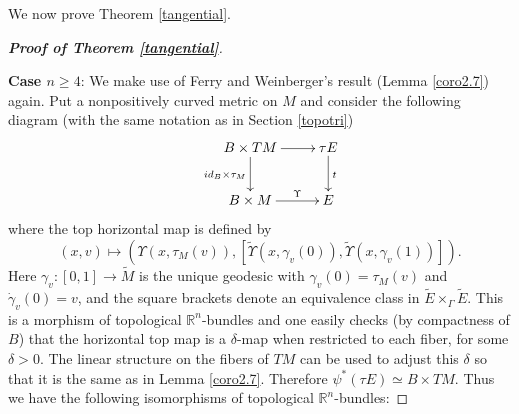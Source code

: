 \documentclass[onecolumn,notitlepage,11pt]{article}
\newcommand{\R}{\mathbb{R}}
\newcommand{\beq}{\begin{equation*}}
\newcommand{\eeq}{\end{equation*}}
\newtheorem{lemma}{Lemma}[section]
\theoremstyle{definition}
\begin{document}
We now prove Theorem \ref{tangential}. 
\begin{proof}[\textbf{Proof of Theorem \ref{tangential}}]\ 

\textbf{Case $n\geq 4$}: We make use of Ferry and 
Weinberger's result (Lemma \ref{coro2.7}) again. 
Put a nonpositively curved metric on $M$ and
consider the following diagram 
(with the same notation as in Section \ref{topotri})
\beq
\xymatrix{
& B\times TM\ar[r]\ar[d]_{id_B\times\tau_M} & \tau E\ar[d]^{t}\\
& B\times M\ar[r]^-{\Upsilon} &  E}
\eeq
where the top horizontal map is defined by
\beq
(x,v)\mapsto\left(\Upsilon(x,\tau_M(v)),
\left[\widetilde{\Upsilon}(x,\gamma_v(0)),
\widetilde{\Upsilon}(x,\gamma_v(1))\right]\right).
\eeq
Here $\gamma_v:[0,1]\to\widetilde{M}$ is the unique geodesic
with $\gamma_v(0)=\tau_M(v)$ and $\dot{\gamma}_v(0)=v$, 
and the square brackets denote an
equivalence class in $\widetilde{E}\times_{\Gamma}\widetilde{E}$.
This is a morphism of topological
$\R^n$-bundles and one easily checks (by compactness of $B$) that the 
horizontal top map is a $\delta$-map when restricted to each
fiber, for some $\delta>0$. The linear structure on the fibers
of $TM$ can be used to adjust this $\delta$ so that it is the same
as in Lemma \ref{coro2.7}.  Therefore
$\psi^*(\tau E)\simeq B\times TM$. Thus we have the following isomorphisms
of topological $\R^n$-bundles:
%


\end{proof}
\end{document}

